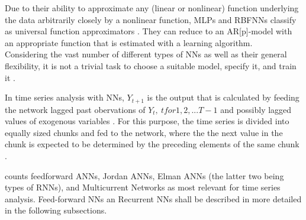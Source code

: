 \documentclass[a4paper, 11pt]{article}
\begin{document}
Due to their ability to approximate any (linear or nonlinear) function underlying the data arbitrarily closely by a nonlinear function, MLPs and RBFNNs classify as universal function approximators \citep{Dorffner96neuralnetworks}. They can reduce to an AR[p]-model with an appropriate function that is estimated with a learning algorithm.\\
Considering the vast number of different types of NNs as well as their general flexibility, it is not a trivial task to choose a suitable model, specify it, and train it \citep{Kourentzes.2014}. 

In time series analysis with NNs, $Y_{t+1}$ is the output that is calculated by feeding the network lagged past obervations of $Y_{t}, \ t for 1,2,... T-1$ and possibly lagged values of exogenous variables \citep{Kourentzes.2014}.
For this purpose, the time series is divided into equally sized chunks and fed to the network, where the the next value in the chunk is expected to be determined by the preceding elements of the same chunk \citep{Pinto}.


\cite{Dorffner96neuralnetworks} counts feedforward ANNs, Jordan ANNs, Elman ANNs (the latter two being types of RNNs), and Multicurrent Networks as most relevant for time series analysis.
Feed-forward NNs an Recurrent NNs shall be described in more detailed in the following subsections.
\end{document}
